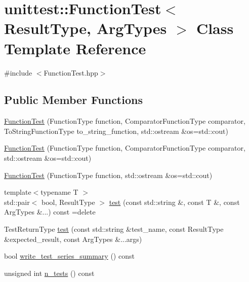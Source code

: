\hypertarget{classunittest_1_1_function_test}{}\section{unittest\+:\+:Function\+Test$<$ Result\+Type, Arg\+Types $>$ Class Template Reference}
\label{classunittest_1_1_function_test}


{\ttfamily \#include $<$Function\+Test.\+hpp$>$}

\subsection*{Public Member Functions}
\begin{DoxyCompactItemize}
\item 
\hyperlink{classunittest_1_1_function_test_a9bb46bed56452a5354848e7d5744c715}{Function\+Test} (Function\+Type function, Comparator\+Function\+Type comparator, To\+String\+Function\+Type to\+\_\+string\+\_\+function, std\+::ostream \&os=std\+::cout)
\item 
\hyperlink{classunittest_1_1_function_test_addafa5fd128998c358ef14732d4afeb0}{Function\+Test} (Function\+Type function, Comparator\+Function\+Type comparator, std\+::ostream \&os=std\+::cout)
\item 
\hyperlink{classunittest_1_1_function_test_a27a92d51dc33cdd08f025555b3d73de8}{Function\+Test} (Function\+Type function, std\+::ostream \&os=std\+::cout)
\item 
{\footnotesize template$<$typename T $>$ }\\std\+::pair$<$ bool, Result\+Type $>$ \hyperlink{classunittest_1_1_function_test_abd6a6fe7f829fbedb7fdec63a61ed122}{test} (const std\+::string \&, const T \&, const Arg\+Types \&...) const  =delete
\item 
Test\+Return\+Type \hyperlink{classunittest_1_1_function_test_adeb82aea0d7e1975da9f55d5170d31d6}{test} (const std\+::string \&test\+\_\+name, const Result\+Type \&expected\+\_\+result, const Arg\+Types \&...args)
\item 
bool \hyperlink{classunittest_1_1_function_test_a1263b315394a9d4d8bf2a7f5e66be9c6}{write\+\_\+test\+\_\+series\+\_\+summary} () const 
\item 
unsigned int \hyperlink{classunittest_1_1_function_test_a377bc6b2de27ae65ca82f7f063691745}{n\+\_\+tests} () const \hypertarget{classunittest_1_1_function_test_a377bc6b2de27ae65ca82f7f063691745}{}\label{classunittest_1_1_function_test_a377bc6b2de27ae65ca82f7f063691745}


\end{DoxyCompactItemize}
